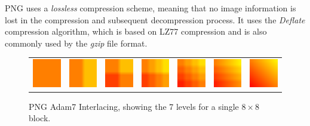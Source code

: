PNG \cite{Boutell97} uses a {\it lossless} compression scheme, meaning that no image information is lost in the compression and subsequent decompression process. It uses the {\it Deflate} compression algorithm, which is based on LZ77 compression and is also commonly used by the {\it gzip} file format.

\begin{figure}
\begin{center}
\begin{tabular}{ccccccc}
\includegraphics[width=1.5cm]{../images/adam7_1} &
\includegraphics[width=1.5cm]{../images/adam7_2} &
\includegraphics[width=1.5cm]{../images/adam7_3} &
\includegraphics[width=1.5cm]{../images/adam7_4} &
\includegraphics[width=1.5cm]{../images/adam7_5} &
\includegraphics[width=1.5cm]{../images/adam7_6} &
\includegraphics[width=1.5cm]{../images/adam7_7}
\end{tabular}
\caption[PNG Adam7 Interlacing]{\label{fig:adam7} PNG Adam7 Interlacing, showing the 7 levels for a single $8\times8$ block.}
\end{center}
\end{figure}

